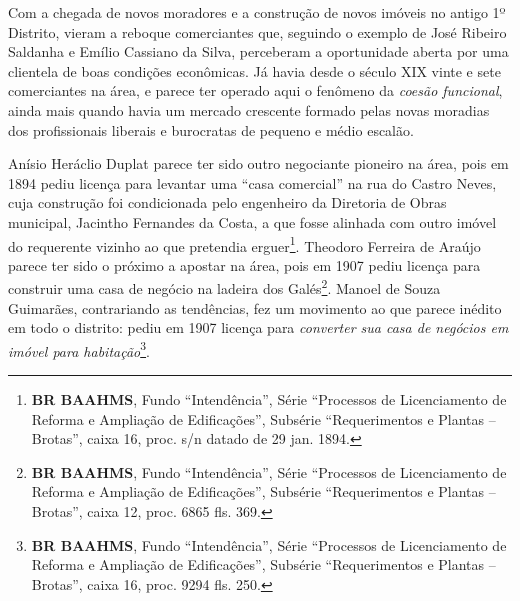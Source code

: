 
Com a chegada de novos moradores e a construção de novos imóveis no antigo 1º Distrito, vieram a reboque comerciantes que, seguindo o exemplo de José Ribeiro Saldanha e Emílio Cassiano da Silva, perceberam a oportunidade aberta por uma clientela de boas condições econômicas. Já havia desde o século XIX vinte e sete comerciantes na área, e parece ter operado aqui o fenômeno da \textit{coesão funcional}, ainda mais quando havia um mercado crescente formado pelas novas moradias dos profissionais liberais e burocratas de pequeno e médio escalão.

Anísio Heráclio Duplat parece ter sido outro negociante pioneiro na área, pois em 1894 pediu licença para levantar uma ``casa comercial'' na rua do Castro Neves, cuja construção foi condicionada pelo engenheiro da Diretoria de Obras municipal, Jacintho Fernandes da Costa, a que fosse alinhada com outro imóvel do requerente vizinho ao que pretendia erguer\footnote{\textbf{BR BAAHMS}, Fundo ``Intendência'', Série ``Processos de Licenciamento de Reforma e Ampliação de Edificações'', Subsérie ``Requerimentos e Plantas -- Brotas'', caixa 16, proc. s/n datado de 29 jan. 1894.}. Theodoro Ferreira de Araújo parece ter sido o próximo a apostar na área, pois em 1907 pediu licença para construir uma casa de negócio na ladeira dos Galés\footnote{\textbf{BR BAAHMS}, Fundo ``Intendência'', Série ``Processos de Licenciamento de Reforma e Ampliação de Edificações'', Subsérie ``Requerimentos e Plantas -- Brotas'', caixa 12, proc. 6865 fls. 369.}. Manoel de Souza Guimarães, contrariando as tendências, fez um movimento ao que parece inédito em todo o distrito: pediu em 1907 licença para \textit{converter sua casa de negócios em imóvel para habitação}\footnote{\textbf{BR BAAHMS}, Fundo ``Intendência'', Série ``Processos de Licenciamento de Reforma e Ampliação de Edificações'', Subsérie ``Requerimentos e Plantas -- Brotas'', caixa 16, proc. 9294 fls. 250.}.

